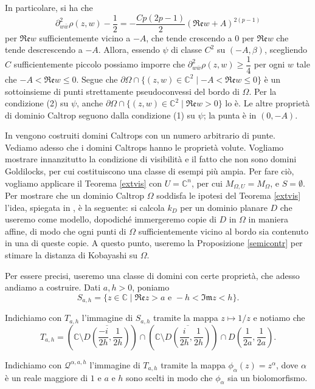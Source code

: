 In particolare, si ha che
$$\partial^2_{w\bar{w}}\rho(z,w)-\frac{1}{2}=-\frac{Cp(2p-1)}{2}(\mathfrak{Re}w+A)^{2(p-1)}$$
per $\mathfrak{Re}w$ sufficientemente vicino a $-A$, che tende crescendo a $0$ per $\mathfrak{Re}w$ che tende descrescendo a $-A$. Allora, essendo $\psi$ di classe $C^2$ su $(-A,\beta)$, scegliendo $C$ sufficientemente piccolo possiamo imporre che $\partial^2_{w\bar{w}}\rho(z,w)\ge\dfrac{1}{4}$ per ogni $w$ tale che $-A<\mathfrak{Re}w\le 0$. Segue che $\partial\Omega\cap\{(z,w)\in\mathbb{C}^2\mid -A<\mathfrak{Re}w\le 0\}$ è un sottoinsieme di punti strettamente pseudoconvessi del bordo di $\Omega$. Per la condizione (2) su $\psi$, anche $\partial\Omega\cap\{(z,w)\in\mathbb{C}^2\mid \mathfrak{Re}w>0\}$ lo è. Le altre proprietà di dominio Caltrop seguono dalla condizione (1) su $\psi$; la punta è in $(0,-A)$.

In \cite[Section 3.2]{CMS} vengono costruiti domini Caltrops con un numero arbitrario di punte. \\

Vediamo adesso che i domini Caltrops hanno le proprietà volute. Vogliamo mostrare innanzitutto la condizione di visibilità e il fatto che non sono domini Goldilocks, per cui costituiscono una classe di esempi più ampia. Per fare ciò, vogliamo applicare il Teorema \ref{extvis} con $U=\mathbb{C}^n$, per cui $M_{\Omega,U}=M_\Omega$, e $S=\emptyset$. Per mostrare che un dominio Caltrop $\Omega$ soddisfa le ipotesi del Teorema \ref{extvis} l'idea, spiegata in \cite[Section 6]{CMS}, è la seguente: si calcola $k_D$ per un dominio planare $D$ che useremo come modello, dopodiché immergeremo copie di $D$ in $\Omega$ in maniera affine, di modo che ogni punti di $\Omega$ sufficientemente vicino al bordo sia contenuto in una di queste copie. A questo punto, useremo la Proposizione \ref{semicontr} per stimare la distanza di Kobayashi su $\Omega$. 

Per essere precisi, useremo una classe di domini con certe proprietà, che adesso andiamo a costruire. Dati $a,h>0$, poniamo
$$S_{a,h}=\{z\in\mathbb{C}\mid\mathfrak{Re}z>a\text{ e }-h<\mathfrak{Im}z<h\}.$$

Indichiamo con $T_{a,h}$ l'immagine di $S_{a,h}$ tramite la mappa $z\longmapsto 1/z$ e notiamo che
$$T_{a,h}=\left(\mathbb{C}\setminus\overline{D\left(\frac{-i}{2h},\frac{1}{2h}\right)}\right)\cap\left(\mathbb{C}\setminus\overline{D\left(\frac{i}{2h},\frac{1}{2h}\right)}\right)\cap D\left(\frac{1}{2a},\frac{1}{2a}\right).$$

Indichiamo con $\mathcal{Q}^{\alpha,a,h}$ l'immagine di $T_{a,h}$ tramite la mappa $\phi_\alpha(z)=z^{\alpha}$, dove $\alpha$ è un reale maggiore di $1$ e $a$ e $h$ sono scelti in modo che $\phi_\alpha$ sia un biolomorfismo.

